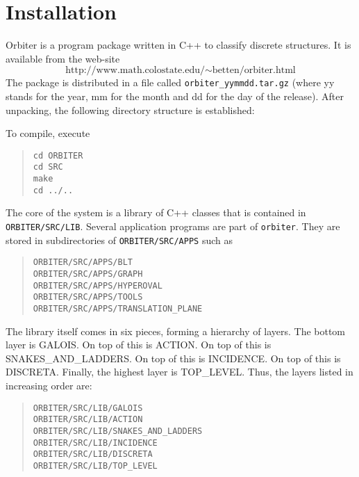 \section{Installation}
\label{sec:installation}


Orbiter is a program package written in C++ to classify discrete structures.
It is available from the web-site
$$
\mbox{http://www.math.colostate.edu/$\sim$betten/orbiter.html}
$$
The package is distributed in a file called \verb'orbiter_yymmdd.tar.gz' (where yy stands for the year, mm for the month and dd for the day of the release).
After unpacking, the following directory structure is established:

{\tt

}

To compile, execute
\begin{quote}
\verb'cd ORBITER'\\
\verb'cd SRC'\\
\verb'make'\\
\verb'cd ../..' \\
\end{quote}
The core of the system is a library of C++ classes that is contained in 
\verb'ORBITER/SRC/LIB'.
Several application programs are part of \verb'orbiter'. 
They are stored in subdirectories of \verb'ORBITER/SRC/APPS' such as 
\begin{quote}
\verb'ORBITER/SRC/APPS/BLT'\\
\verb'ORBITER/SRC/APPS/GRAPH'\\
\verb'ORBITER/SRC/APPS/HYPEROVAL'\\
\verb'ORBITER/SRC/APPS/TOOLS'\\
\verb'ORBITER/SRC/APPS/TRANSLATION_PLANE'\\
\end{quote}
The library itself comes in six pieces, forming a hierarchy of layers.
The bottom layer is GALOIS. On top of this is ACTION. On top of this is SNAKES\_AND\_LADDERS. 
On top of this is INCIDENCE. 
On top of this is DISCRETA.
Finally, the highest layer is TOP\_LEVEL.
Thus, the layers listed in increasing order are:
\begin{quote}
\verb'ORBITER/SRC/LIB/GALOIS'\\
\verb'ORBITER/SRC/LIB/ACTION'\\
\verb'ORBITER/SRC/LIB/SNAKES_AND_LADDERS'\\
\verb'ORBITER/SRC/LIB/INCIDENCE'\\
\verb'ORBITER/SRC/LIB/DISCRETA'\\
\verb'ORBITER/SRC/LIB/TOP_LEVEL'\\
\end{quote}
